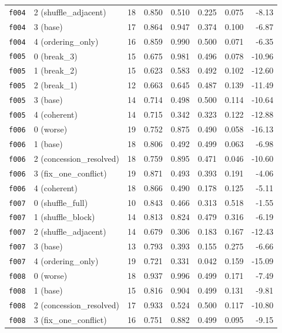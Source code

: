 \documentclass[11pt]{article}
\begin{document}
\begin{table}[htbp]
\begin{tabular}{llrrrrrr}
\texttt{f004} & 2 (shuffle\_adjacent) & 18 & 0.850 & 0.510 & 0.225 & 0.075 & -8.13 \\
\texttt{f004} & 3 (base) & 17 & 0.864 & 0.947 & 0.374 & 0.100 & -6.87 \\
\texttt{f004} & 4 (ordering\_only) & 16 & 0.859 & 0.990 & 0.500 & 0.071 & -6.35 \\
\midrule
\texttt{f005} & 0 (break\_3) & 15 & 0.675 & 0.981 & 0.496 & 0.078 & -10.96 \\
\texttt{f005} & 1 (break\_2) & 15 & 0.623 & 0.583 & 0.492 & 0.102 & -12.60 \\
\texttt{f005} & 2 (break\_1) & 12 & 0.663 & 0.645 & 0.487 & 0.139 & -11.49 \\
\texttt{f005} & 3 (base) & 14 & 0.714 & 0.498 & 0.500 & 0.114 & -10.64 \\
\texttt{f005} & 4 (coherent) & 14 & 0.715 & 0.342 & 0.323 & 0.122 & -12.88 \\
\midrule
\texttt{f006} & 0 (worse) & 19 & 0.752 & 0.875 & 0.490 & 0.058 & -16.13 \\
\texttt{f006} & 1 (base) & 18 & 0.806 & 0.492 & 0.499 & 0.063 & -6.98 \\
\texttt{f006} & 2 (concession\_resolved) & 18 & 0.759 & 0.895 & 0.471 & 0.046 & -10.60 \\
\texttt{f006} & 3 (fix\_one\_conflict) & 19 & 0.871 & 0.493 & 0.393 & 0.191 & -4.06 \\
\texttt{f006} & 4 (coherent) & 18 & 0.866 & 0.490 & 0.178 & 0.125 & -5.11 \\
\midrule
\texttt{f007} & 0 (shuffle\_full) & 10 & 0.843 & 0.466 & 0.313 & 0.518 & -1.55 \\
\texttt{f007} & 1 (shuffle\_block) & 14 & 0.813 & 0.824 & 0.479 & 0.316 & -6.19 \\
\texttt{f007} & 2 (shuffle\_adjacent) & 14 & 0.679 & 0.306 & 0.183 & 0.167 & -12.43 \\
\texttt{f007} & 3 (base) & 13 & 0.793 & 0.393 & 0.155 & 0.275 & -6.66 \\
\texttt{f007} & 4 (ordering\_only) & 19 & 0.721 & 0.331 & 0.042 & 0.159 & -15.09 \\
\midrule
\texttt{f008} & 0 (worse) & 18 & 0.937 & 0.996 & 0.499 & 0.171 & -7.49 \\
\texttt{f008} & 1 (base) & 15 & 0.816 & 0.904 & 0.499 & 0.131 & -9.81 \\
\texttt{f008} & 2 (concession\_resolved) & 17 & 0.933 & 0.524 & 0.500 & 0.117 & -10.80 \\
\texttt{f008} & 3 (fix\_one\_conflict) & 16 & 0.751 & 0.882 & 0.499 & 0.095 & -9.15 \\

\end{tabular}
\end{table}
\end{document}
